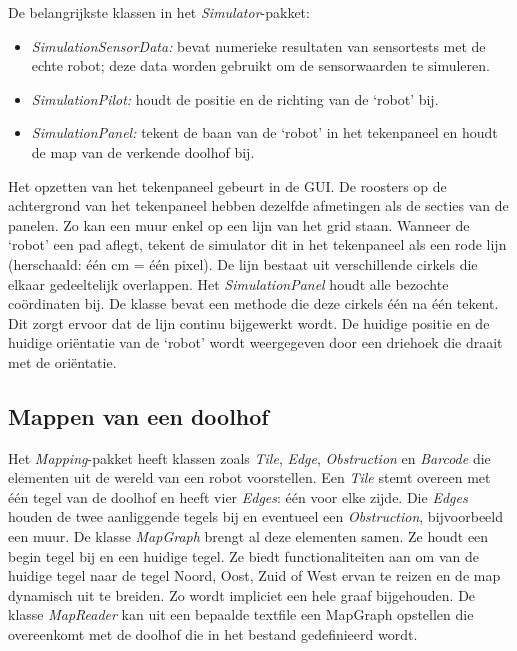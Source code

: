 \documentclass[t1]{penoverslag}
\begin{document}
De belangrijkste klassen in het \textit{Simulator}-pakket:

\begin{itemize}
\item \textit{SimulationSensorData:} bevat numerieke resultaten van sensortests met de echte robot; deze data worden gebruikt om de sensorwaarden te simuleren.
\item \textit{SimulationPilot:} houdt de positie en de richting van de `robot' bij.
\item \textit{SimulationPanel:} tekent de baan van de `robot' in het tekenpaneel en houdt de map van de verkende doolhof bij.
\end{itemize}

Het opzetten van het tekenpaneel gebeurt in de GUI. De roosters op de achtergrond van het tekenpaneel hebben dezelfde afmetingen als de secties van de panelen. Zo kan een muur enkel op een lijn van het grid staan.
Wanneer de `robot' een pad aflegt, tekent de simulator dit in het tekenpaneel als een rode lijn (herschaald: \'e\'en cm = \'e\'en pixel). De lijn  bestaat uit verschillende cirkels die elkaar gedeeltelijk overlappen. Het \textit{SimulationPanel} houdt alle bezochte co\"ordinaten bij. De klasse bevat een methode die deze cirkels \'e\'en na \'e\'en tekent. Dit zorgt ervoor dat de lijn continu bijgewerkt wordt. De huidige positie en de huidige ori\"entatie van de `robot' wordt weergegeven door een driehoek die draait met de ori\"entatie.

\subsection{Mappen van een doolhof} %
\label{ssec:mapping}
Het \textit{Mapping}-pakket heeft klassen zoals \textit{Tile}, \textit{Edge}, \textit{Obstruction} en \textit{Barcode} die elementen uit de wereld van een robot voorstellen. Een \textit{Tile} stemt overeen met \'e\'en tegel van de doolhof en heeft vier \textit{Edges}: \'e\'en voor elke zijde. Die \textit{Edges} houden de twee aanliggende tegels bij en eventueel een \textit{Obstruction}, bijvoorbeeld een muur. De klasse \textit{MapGraph} brengt al deze elementen samen. Ze houdt een begin tegel bij en een huidige tegel. Ze biedt functionaliteiten aan om van de huidige tegel naar de tegel Noord, Oost, Zuid of West ervan te reizen en de map dynamisch uit te breiden. Zo wordt impliciet een hele graaf bijgehouden. De klasse \textit{MapReader} kan uit een bepaalde textfile een MapGraph opstellen die overeenkomt met de doolhof die in het bestand gedefinieerd wordt.\\
\end{document}
